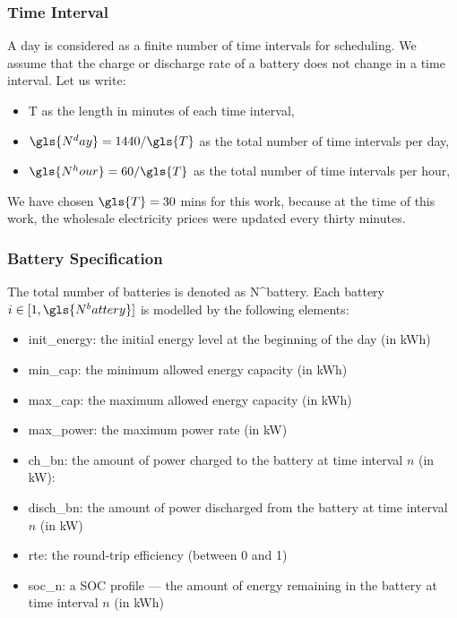 \subsubsection{Time Interval}

A day is considered as a finite number of time intervals for scheduling. 
We assume that the charge or discharge rate of a battery does not change in a time interval. Let us write:

\begin{itemize}
	\item \gls{T} as the length in minutes of each time interval,
	
	\item $\gls{N^day} = 1440 / \gls{T}$ as the total number of time intervals per day,
	
	\item $\gls{N^hour} = 60 / \gls{T} $ as the total number of time intervals per hour,
	
\end{itemize}
We have chosen $\gls{T} = 30 $ mins for this work, because at the time of this work, the wholesale electricity prices were updated every thirty minutes. 

\subsubsection{Battery Specification}

The total number of batteries is denoted as \gls{N^battery}. Each battery $i \in [1, \gls{N^battery}]$ is modelled by the following elements:

\begin{itemize}
	\item \gls{init_energy}: the initial energy level at the beginning of the day (in kWh)
	
	\item \gls{min_cap}: the minimum allowed energy capacity (in kWh)
	
	\item \gls{max_cap}: the maximum allowed energy capacity (in kWh)
	
	\item \gls{max_power}: the maximum power rate (in kW)
	
	\item \gls{ch_bn}: the amount of power charged to the battery at time interval $n$ (in kW): 
	
	\item \gls{disch_bn}: the amount of power discharged from the battery at time interval $n$ (in kW) 
	
	\item \gls{rte}: the round-trip efficiency (between 0 and 1)
	
	\item \gls{soc_n}: a \gls{SOC} profile --- the amount of energy remaining in the battery at time interval $n$ (in kWh)
\end{itemize}


